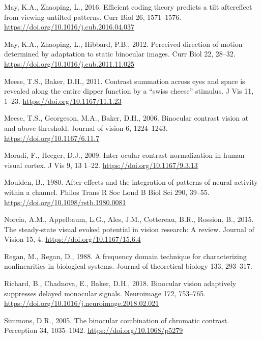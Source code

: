 \documentclass[
  12pt,
]{article}
\newlength{\cslhangindent}
\newenvironment{CSLReferences}[2] %
 {\begin{list}{}{%
  \setlength{\itemindent}{0pt}
  \setlength{\leftmargin}{0pt}
  \setlength{\parsep}{0pt}
  \ifodd #1
   \setlength{\leftmargin}{\cslhangindent}
   \setlength{\itemindent}{-1\cslhangindent}
  \fi
  \setlength{\itemsep}{#2\baselineskip}}}
 {\end{list}}
\begin{document}
\begin{CSLReferences}{1}{0}
May, K.A., Zhaoping, L., 2016. Efficient coding theory predicts a tilt
aftereffect from viewing untilted patterns. Curr Biol 26, 1571--1576.
\url{https://doi.org/10.1016/j.cub.2016.04.037}

May, K.A., Zhaoping, L., Hibbard, P.B., 2012. Perceived direction of
motion determined by adaptation to static binocular images. Curr Biol
22, 28--32. \url{https://doi.org/10.1016/j.cub.2011.11.025}

Meese, T.S., Baker, D.H., 2011. Contrast summation across eyes and space
is revealed along the entire dipper function by a {``swiss cheese''}
stimulus. J Vis 11, 1--23. \url{https://doi.org/10.1167/11.1.23}

Meese, T.S., Georgeson, M.A., Baker, D.H., 2006. Binocular contrast
vision at and above threshold. Journal of vision 6, 1224--1243.
\url{https://doi.org/10.1167/6.11.7}

Moradi, F., Heeger, D.J., 2009. Inter-ocular contrast normalization in
human visual cortex. J Vis 9, 13 1--22.
\url{https://doi.org/10.1167/9.3.13}

Moulden, B., 1980. After-effects and the integration of patterns of
neural activity within a channel. Philos Trans R Soc Lond B Biol Sci
290, 39--55. \url{https://doi.org/10.1098/rstb.1980.0081}

Norcia, A.M., Appelbaum, L.G., Ales, J.M., Cottereau, B.R., Rossion, B.,
2015. The steady-state visual evoked potential in vision research: A
review. Journal of Vision 15, 4. \url{https://doi.org/10.1167/15.6.4}

Regan, M., Regan, D., 1988. A frequency domain technique for
characterizing nonlinearities in biological systems. Journal of
theoretical biology 133, 293--317.

Richard, B., Chadnova, E., Baker, D.H., 2018. Binocular vision
adaptively suppresses delayed monocular signals. Neuroimage 172,
753--765. \url{https://doi.org/10.1016/j.neuroimage.2018.02.021}

Simmons, D.R., 2005. The binocular combination of chromatic contrast.
Perception 34, 1035--1042. \url{https://doi.org/10.1068/p5279}


\end{CSLReferences}
\end{document}
